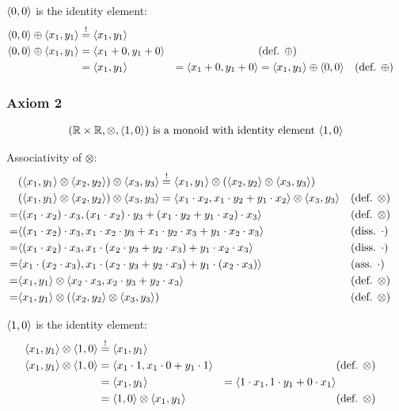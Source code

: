 \documentclass[a4paper,12pt]{ETHexercise}
\begin{document}
$\langle0, 0\rangle$ is the identity element:
\begin{align}
    \langle0, 0\rangle \oplus \langle x_1, y_1\rangle &\stackrel{!}{=} \langle x_1, y_1\rangle\\
    \langle0, 0\rangle \oplus \langle x_1, y_1\rangle &= \langle x_1+0, y_1+0\rangle &&(\text{def. } \oplus)\\
    &=  \langle x_1, y_1\rangle
    &=  \langle x_1 + 0, y_1 + 0\rangle
    &= \langle x_1, y_1\rangle \oplus \langle0, 0\rangle &&(\text{def. } \oplus)
\end{align}

\subsubsection*{Axiom 2}
\begin{align*}
    (\mathbb{R} \times \mathbb{R}, \otimes, \langle1, 0\rangle) \text{ is a monoid with identity element } \langle1, 0\rangle
\end{align*}

Associativity of $\otimes$:
\begin{align}
    &(\langle x_1, y_1\rangle \otimes \langle x_2, y_2\rangle) \otimes \langle x_3, y_3\rangle \stackrel{!}{=} \langle x_1, y_1\rangle \otimes (\langle x_2, y_2\rangle \otimes \langle x_3, y_3\rangle)\\
    &(\langle x_1, y_1\rangle \otimes \langle x_2, y_2\rangle) \otimes \langle x_3, y_3\rangle =
    \langle x_1 \cdot x_2, x_1 \cdot y_2 + y_1 \cdot x_2\rangle \otimes \langle x_3, y_3\rangle &&(\text{def. } \otimes)\\
    =  &\langle(x_1 \cdot x_2) \cdot x_3, (x_1 \cdot x_2) \cdot y_3 + (x_1 \cdot y_2 + y_1 \cdot x_2) \cdot x_3\rangle &&(\text{def. } \otimes)\\
    =  &\langle(x_1 \cdot x_2) \cdot x_3, x_1 \cdot x_2 \cdot y_3 + x_1 \cdot y_2 \cdot x_3 + y_1 \cdot x_2 \cdot x_3 \rangle &&(\text{diss. } \cdot)\\ 
    =  &\langle(x_1 \cdot x_2) \cdot x_3, x_1 \cdot (x_2 \cdot y_3 + y_2 \cdot x_3) + y_1 \cdot x_2 \cdot x_3 \rangle &&(\text{diss. } \cdot)\\
    =  &\langle x_1 \cdot( x_2 \cdot x_3), x_1 \cdot (x_2 \cdot y_3 + y_2 \cdot x_3) + y_1 \cdot (x_2 \cdot x_3) \rangle &&(\text{ass. } \cdot)\\
    =  &\langle x_1, y_1\rangle \otimes \langle x_2 \cdot x_3, x_2 \cdot y_3 + y_2 \cdot x_3\rangle &&(\text{def. } \otimes)\\
    =  &\langle x_1, y_1\rangle \otimes (\langle x_2, y_2\rangle \otimes \langle x_3, y_3\rangle) &&(\text{def. } \otimes)
\end{align}

$\langle1, 0\rangle$ is the identity element:
\begin{align}
    \langle x_1, y_1\rangle \otimes \langle1, 0\rangle &\stackrel{!}{=} \langle x_1, y_1\rangle\\
    \langle x_1, y_1\rangle \otimes \langle1, 0\rangle &= \langle x_1 \cdot 1, x_1 \cdot 0 + y_1 \cdot 1\rangle &&(\text{def. } \otimes)\\
    &= \langle x_1, y_1\rangle
    &= \langle1 \cdot x_1, 1 \cdot y_1 + 0 \cdot x_1\rangle\\
    &= \langle1, 0\rangle \otimes \langle x_1, y_1\rangle &&(\text{def. } \otimes)
\end{align}
\end{document}
